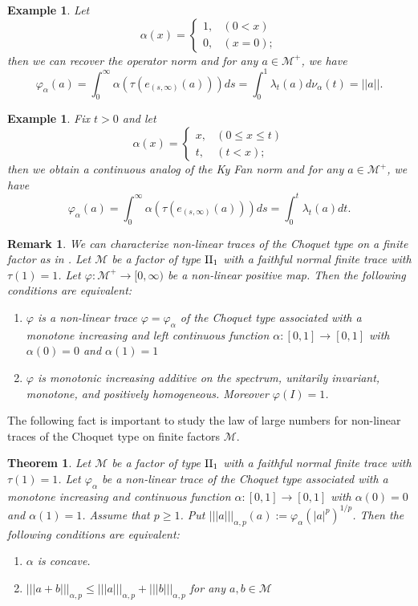 \documentclass[a4paper,12pt]{amsart}
\newtheorem{theorem}[definition]{Theorem}
\newtheorem{remark}[definition]{Remark}
\newtheorem{example}[definition]{Example}
\newcommand{\M}{\mathcal{M}}
\begin{document}
\begin{example} \rm
Let  $$
\alpha(x) 
= \begin{cases}
1,   & (0 < x) \\
0,    & (x = 0); 
\end{cases}
$$
then we can recover the operator norm and for any $a \in \M^+$,  we have 
$$
\varphi_{\alpha}(a) 
 = \int_0^{\infty}  \alpha(\tau(e_{(s,\infty)}(a)))ds = \int_0^{1} \lambda_t(a) d\nu_{\alpha}(t) = ||a||.
$$
\end{example}


\begin{example} \rm
Fix $t > 0$ and 
let  $$
\alpha(x) 
= \begin{cases}
x,    & (0 \leq x \leq t ) \\
t,    & (t < x ); 
\end{cases}
$$
then we obtain a continuous analog of  the Ky Fan norm and for any $a \in \M^+$,  we have 
$$
\varphi_{\alpha}(a) 
 = \int_0^{\infty}  \alpha(\tau(e_{(s,\infty)}(a)))ds = \int_0^{t} \lambda_t(a) dt.   
$$
\end{example}

\begin{remark} \rm 
We can characterize non-linear traces of the Choquet type on a finite factor as in \cite[Theorem 2.29
]{nagisawatatani4}.  
Let $\M$ be a factor of type ${\rm II}_1$ with a faithful normal finite trace with $\tau(1) = 1$. 
Let $\varphi : \M^+ \rightarrow  [0, \infty)$ be a non-linear 
positive map.  Then the following conditions are equivalent:
\begin{enumerate}
\item[$(1)$]  $\varphi$ is a non-linear trace $\varphi = \varphi_{\alpha}$  of the Choquet type associated with  
a monotone increasing and left continuous function $\alpha: [0, 1] \rightarrow [0, 1]$  with $\alpha(0) = 0$ and 
$\alpha(1) = 1$
\item[$(2)$] $\varphi $ is monotonic increasing additive on the spectrum, unitarily invariant, monotone, and 
positively homogeneous.  Moreover $\varphi(I) = 1$.  
\end{enumerate}
\end{remark}

The following fact is important to study the law of large numbers for non-linear traces of the Choquet type on finite factors $\M$.
\begin{theorem} \cite[Remark 2.32
]{nagisawatatani4}
\label{thm:triangle inequality}
Let $\M$ be a factor of type ${\rm II}_1$ with a faithful normal finite trace with $\tau(1) = 1$. 
Let $\varphi_{\alpha}$  be a non-linear trace of the Choquet type associated with  
a monotone increasing and continuous function $\alpha: [0, 1] \rightarrow [0, 1]$  with $\alpha(0) = 0$ and 
$\alpha(1) = 1$.  Assume that $p \geq 1$.  Put $|||a|||_{\alpha,p}(a) := \varphi_\alpha(|a|^p)^{1/p} $. Then the following conditions are equivalent:
\begin{enumerate}
  \item[(a)]  $\alpha$ is concave.
  \item[(b)]  $|||a+b|||_{\alpha, p} \le |||a|||_{\alpha, p} + |||b|||_{\alpha, p}$  for any  $a, b\in \M$ 
\end{enumerate}
\end{theorem}
\end{document}
